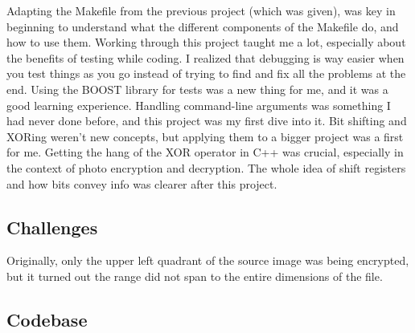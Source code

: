 Adapting the Makefile from the previous project (which was given), was key in beginning to understand what the different components of the Makefile do, and how to use them. Working through this project taught me a lot, especially about the benefits of testing while coding. I realized that debugging is way easier when you test things as you go instead of trying to find and fix all the problems at the end. Using the BOOST library for tests was a new thing for me, and it was a good learning experience. Handling command-line arguments was something I had never done before, and this project was my first dive into it. Bit shifting and XORing weren't new concepts, but applying them to a bigger project was a first for me. Getting the hang of the XOR operator in C++ was crucial, especially in the context of photo encryption and decryption. The whole idea of shift registers and how bits convey info was clearer after this project.

\subsection{Challenges}\label{sec:ps1:challenges}

Originally, only the upper left quadrant of the source image was being encrypted, but it turned out the range did not span to the entire dimensions of the file. 

\subsection{Codebase}\label{sec:ps1:code}









\newpage
